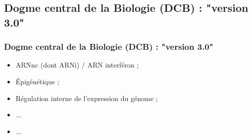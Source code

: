 \documentclass{beamer}
\begin{document}
\subsection{Dogme central de la Biologie (DCB) : "version 3.0"}
\begin{frame}
	\frametitle{Dogme central de la Biologie (DCB) : "version 3.0"}
	\begin{itemize}
		\item ARNnc (dont ARNi) / ARN interf{\'e}ron ; 
		\item {\'E}pig{\'e}n{\'e}tique ; 
		\item R{\'e}gulation interne de l'expression du g{\'e}nome ; 
		\item ... 
		\item ... 
	\end{itemize}
\end{frame}
\end{document}
